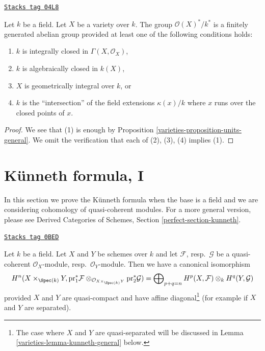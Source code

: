 \begin{lemma}
\label{varieties-lemma-units-variety}
\href{https://stacks.math.columbia.edu/tag/04L8}{\texttt{Stacks tag 04L8}}

Let $k$ be a field.
Let $X$ be a variety over $k$.
The group $\mathcal{O}(X)^*/k^*$ is a finitely generated abelian group
provided at least one of the following conditions holds:
\begin{enumerate}
\item $k$ is integrally closed in $\Gamma(X, \mathcal{O}_X)$,
\item $k$ is algebraically closed in $k(X)$,
\item $X$ is geometrically integral over $k$, or
\item $k$ is the ``intersection'' of the field extensions
$\kappa(x)/k$ where $x$ runs over the closed points of $x$.
\end{enumerate}
\end{lemma}

\begin{proof}

We see that (1) is enough by
Proposition \ref{varieties-proposition-units-general}.
We omit the verification that each of (2), (3), (4) implies (1).
\end{proof}

\section{K\"unneth formula, I}
\label{varieties-section-kunneth}
In this section we prove the K\"unneth formula when the base
is a field and we are considering cohomology of quasi-coherent
modules. For a more general version, please see
Derived Categories of Schemes, Section \ref{perfect-section-kunneth}.

\begin{lemma}[Kunneth]
\label{varieties-lemma-kunneth}
\href{https://stacks.math.columbia.edu/tag/0BED}{\texttt{Stacks tag 0BED}}

Let $k$ be a field. Let $X$ and $Y$ be schemes over $k$ and
let $\mathcal{F}$, resp.\ $\mathcal{G}$ be a quasi-coherent
$\mathcal{O}_X$-module, resp.\ $\mathcal{O}_Y$-module.
Then we have a canonical isomorphism
$$
H^n(X \times_{\Spec(k)} Y, \text{pr}_1^*\mathcal{F}
\otimes_{\mathcal{O}_{X \times_{\Spec(k)} Y}} \text{pr}_2^*\mathcal{G}) =
\bigoplus\nolimits_{p + q = n}
H^p(X, \mathcal{F}) \otimes_k H^q(Y, \mathcal{G})
$$
provided $X$ and $Y$ are quasi-compact and have affine
diagonal\footnote{The case where $X$ and $Y$ are quasi-separated
will be discussed in Lemma \ref{varieties-lemma-kunneth-general} below.}
(for example if $X$ and $Y$ are separated).
\end{lemma}

